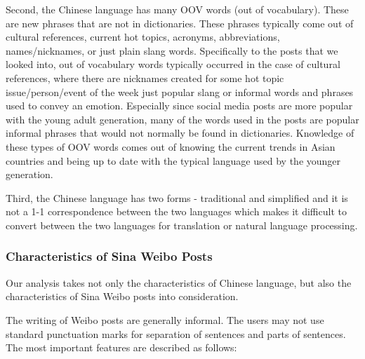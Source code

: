 \documentclass[11pt]{article}
\newcommand{\1}[1]{{\mathbf 1}\left\{#1\right\}}        %
\begin{document}
Second, the Chinese language has many OOV words (out of vocabulary).  These are new phrases that are not in dictionaries.  These phrases typically come out of cultural references, current hot topics, acronyms, abbreviations, names/nicknames, or just plain slang words.  Specifically to the posts that we looked into, out of vocabulary words typically occurred in the case of cultural references, where there are nicknames created for some hot topic issue/person/event of the week just popular slang or informal words and phrases used to 
convey an emotion.  Especially since social media posts are more popular with the young adult generation, many of the words used in the posts are popular informal phrases that would not normally be found in dictionaries. Knowledge of these types of OOV words comes out of knowing the current trends in Asian countries and being up to date with the typical language used by the younger generation.  

Third, the Chinese language has two forms - traditional and simplified and it is not a 1-1 correspondence between the two languages which makes it difficult to convert between the two languages for translation or natural language processing. 



\subsubsection{Characteristics of Sina Weibo Posts}\label{subsec:Weibo}

Our analysis takes not only the characteristics of Chinese language, but also the characteristics of Sina Weibo posts into consideration.

The writing of Weibo posts are generally informal. The users may not use standard punctuation marks for separation of sentences and parts of sentences. The most important features are described as follows:
\end{document}
